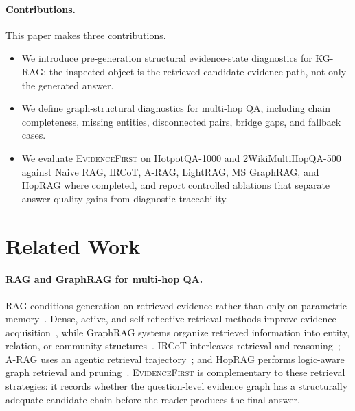 \documentclass[runningheads]{llncs}
\newcommand{\sys}{\textsc{EvidenceFirst}\xspace}
\begin{document}
\paragraph{Contributions.}
This paper makes three contributions.
\begin{itemize}
    \item We introduce pre-generation structural evidence-state diagnostics for
    KG-RAG: the inspected object is the retrieved candidate evidence path, not
    only the generated answer.
    \item We define graph-structural diagnostics for multi-hop QA, including
    chain completeness, missing entities, disconnected pairs, bridge gaps, and
    fallback cases.
    \item We evaluate \sys on HotpotQA-1000 and 2WikiMultiHopQA-500 against
    Naive RAG, IRCoT, A-RAG, LightRAG, MS GraphRAG, and HopRAG where completed,
    and report controlled ablations that separate answer-quality gains from
	    diagnostic traceability.
\end{itemize}

\section{Related Work}
\label{sec:related}

\paragraph{RAG and GraphRAG for multi-hop QA.}
RAG conditions generation on retrieved evidence rather than only on parametric
memory~\cite{lewis2020rag}. Dense, active, and self-reflective retrieval methods
improve evidence acquisition~\cite{karpukhin2020dpr,jiang2023active,asai2023selfrag},
while GraphRAG systems organize retrieved information into entity, relation, or
community structures~\cite{edge2024graphrag,guo2024lightrag,han2025graphragsurvey}.
IRCoT interleaves retrieval and reasoning~\cite{trivedi2022ircot}; A-RAG uses an
agentic retrieval trajectory~\cite{arag2026}; and HopRAG performs logic-aware
graph retrieval and pruning~\cite{yu2025hoprag}. \sys is complementary to these
retrieval strategies: it records whether the question-level evidence graph has a
structurally adequate candidate chain before the reader produces the final
answer.
\end{document}
